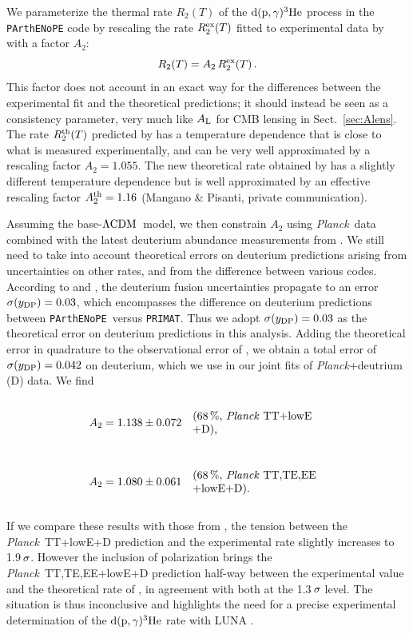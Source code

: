 \documentclass[longauth,traditabstract]{aa}
\def\Planck{\textit{Planck}}
\def\,{\thinspace}
\newcommand{\leftparbox}[2]{\parbox{#1}{\begin{flushleft} #2 \end{flushleft}}}
\newcommand{\oneonesig}[4][5cm]{
\begin{equation}
\left.
  #2 \quad\mbox{\text{\leftparbox{#1}{(68\,\%,~#3)#4}}}
  \right.
\end{equation}
}
\newcommand{\mksym}[1]{\ifmmode {\rm #1}\else #1\fi}
\newcommand{\dataplus}{\allowbreak+}
\newcommand{\TT}{\mksym{TT}}
\newcommand{\TTTEEE}{\mksym{TT,TE,EE}}
\newcommand{\planckTTonly}{\planck\ \TT}
\newcommand{\planckTTTEEEonly}{\planck\ \TTTEEE}
\newcommand{\lowE}{\mksym{lowE}}
\newcommand{\parthenope}{{\tt PArthENoPE}}
\newcommand{\planckTT}{\planckTTonly\dataplus\lowE}
\newcommand{\planckall}{\planckTTTEEEonly\dataplus\lowE}
\newcommand{\lcdm}{\texorpdfstring{{$\rm{\Lambda CDM}$}}{ΛCDM}}
\newcommand{\Alens}{A_{\rm L}}
\providecommand{\text}[1]{\rm{#1}}
\def\beglet{
  \addtocounter{equation}{1}%
  \setcounter{parentequation}{\value{equation}}%
  \setcounter{equation}{0}%
  \def\theequation{\arabic{parentequation}\alph{equation}}%
  \ignorespaces
}
\def\endlet{
  \setcounter{equation}{\value{parentequation}}%
  \def\theequation{\arabic{equation}}%
}
\providecommand{\beglet}{\begin{subequations}}
\providecommand{\endlet}{\end{subequations}}
\newcommand{\paramsII}{\citetalias{planck2014-a15}}
\newcommand{\planck}{\Planck}
\newcommand{\Alenssec}{Sect.~\ref{sec:Alens}}
\begin{document}
We parameterize the thermal rate $R_2(T)$ of the ${\rm d}({\rm p},\gamma)^3 \mbox{He}$ process in the \texttt{PArthENoPE} code by rescaling the rate $R_2^{\rm ex}(T)$ fitted to experimental data by \cite{Adelberger:2010qa} with a factor $A_2$:
\begin{equation}
R_2 (T) = A_2 \, R_2^{\rm ex} (T)\, .
\end{equation}
This factor does not account in an exact way for the differences between
the experimental fit and the theoretical predictions; it should instead be seen as a consistency parameter, very much like $\Alens$ for CMB lensing in \Alenssec. The rate $R_2^{\rm th}(T)$ predicted by \cite{Marcucci:2005zc} has a temperature dependence that is close to what is measured experimentally, and can be very well approximated by a rescaling factor $A_2 = 1.055$. The new theoretical rate obtained by \cite{Marcucci:2015yla} has a slightly different temperature dependence but is well approximated
by an effective rescaling factor $A_2^{\rm th}=1.16$ (Mangano \& Pisanti, private communication).

Assuming the base-\lcdm\ model, we then constrain $A_2$ using \planck\ data combined with the latest deuterium abundance measurements from \citet{Cooke:2017cwo}. We still need to take into account theoretical errors on deuterium predictions arising from uncertainties on other rates, and from the difference between various codes. According to \citet{Marcucci:2015yla} and \citet{Pitrou:2018cgg}, the deuterium fusion uncertainties propagate to an error $\sigma(y_{\rm DP})=0.03$, which encompasses the difference on deuterium predictions between \parthenope\ versus {\tt PRIMAT}. Thus we adopt $\sigma(y_{\rm DP})=0.03$ as the theoretical error on deuterium predictions in this analysis. Adding the theoretical error in quadrature to the observational error of \cite{Cooke:2017cwo}, we obtain a total error of $\sigma(y_{\rm DP})=0.042$ on deuterium, which we use in our joint fits of \planck+deutrium (D) data. We find
\beglet
\oneonesig[4.2cm]{A_2 = 1.138 \pm 0.072}{\planckTT\dataplus{\rm D}}{,}
\vspace{-10mm}
\oneonesig[4.2cm]{A_2 = 1.080 \pm 0.061}{\planckall\dataplus{\rm D}}{.}
\vspace{-4mm}
\endlet
If we compare these results with those from \paramsII, the tension between the \planckTT\dataplus{\rm D} prediction and the experimental rate slightly increases to 1.9$\,\sigma$. However the inclusion of polarization brings the \planckall\dataplus{\rm D} prediction half-way between the experimental value and the theoretical rate of \cite{Marcucci:2015yla}, in agreement with both at the 1.3$\,\sigma$ level. The situation is thus inconclusive and highlights the need for a precise experimental determination of the ${\rm d}({\rm p},\gamma)^3 \mbox{He}$ rate with LUNA \citep{2017EPJWC.13601009G}.
\end{document}
